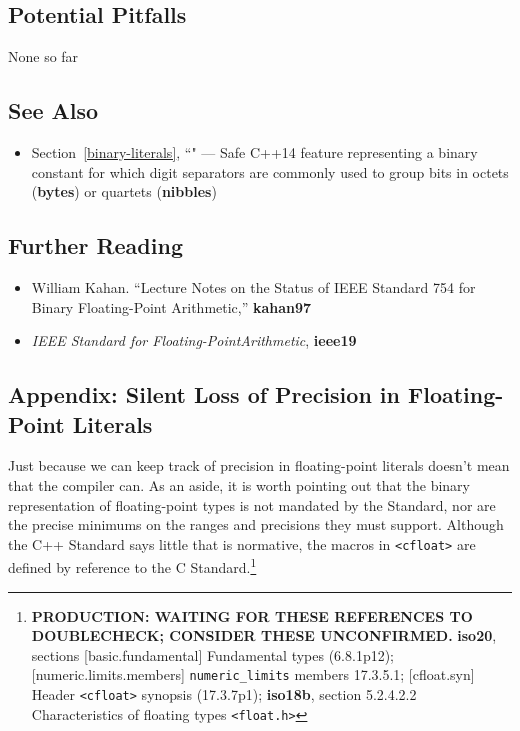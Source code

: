 \subsection[Potential Pitfalls]{Potential Pitfalls}\label{potential-pitfalls}

None so far

\subsection[See Also]{See Also}\label{see-also}

\begin{itemize}
\item{Section~\ref{binary-literals}, ``" — Safe C++14 feature representing a binary constant for which digit separators are commonly used to group bits in octets (\textbf{bytes}) or quartets (\textbf{nibbles})}
\end{itemize}

\subsection[Further Reading]{Further Reading}\label{further-reading}

\begin{itemize}
\item{William Kahan. ``Lecture Notes on the Status of
IEEE Standard 754 for Binary Floating-Point Arithmetic,'' \textbf{kahan97}}
\item{{\textit{IEEE Standard for Floating-PointArithmetic}}, \textbf{ieee19}}
\end{itemize}

\subsection[Appendix: Silent Loss of Precision in Floating-Point Literals]{Appendix: Silent Loss of Precision in Floating-Point Literals}\label{appendix:-silent-loss-of-precision-in-floating-point-literals}

Just because we can keep track of precision in floating-point literals
doesn't mean that the compiler can. As an aside, it is worth
pointing out that the binary representation of floating-point types is
not mandated by the Standard, nor are the precise minimums on the ranges
and precisions they must support. Although the C++ Standard says little
that is normative, the macros in \texttt{<cfloat>} are defined by
reference to the C Standard.{\cprotect\footnote{\textbf{PRODUCTION: WAITING FOR THESE REFERENCES TO DOUBLECHECK; CONSIDER THESE UNCONFIRMED.} \textbf{iso20}, sections [basic.fundamental] Fundamental types (6.8.1p12); [numeric.limits.members] \texttt{numeric\_limits} members 17.3.5.1; [cfloat.syn] Header \texttt{<cfloat>} synopsis (17.3.7p1); \textbf{iso18b}, section 5.2.4.2.2 Characteristics of floating types \texttt{<float.h>} }}

